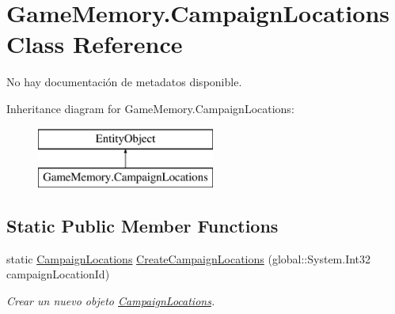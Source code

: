 \hypertarget{class_game_memory_1_1_campaign_locations}{\section{Game\-Memory.\-Campaign\-Locations Class Reference}
\label{class_game_memory_1_1_campaign_locations}
}


No hay documentación de metadatos disponible.  


Inheritance diagram for Game\-Memory.\-Campaign\-Locations\-:\begin{figure}[H]
\begin{center}
\leavevmode
\includegraphics[height=2.000000cm]{class_game_memory_1_1_campaign_locations}
\end{center}
\end{figure}
\subsection*{Static Public Member Functions}
\begin{DoxyCompactItemize}
\item 
static \hyperlink{class_game_memory_1_1_campaign_locations}{Campaign\-Locations} \hyperlink{class_game_memory_1_1_campaign_locations_af7165452c80ac0217123e7aa3c30cd31}{Create\-Campaign\-Locations} (global\-::\-System.\-Int32 campaign\-Location\-Id)
\begin{DoxyCompactList}\small\item\em Crear un nuevo objeto \hyperlink{class_game_memory_1_1_campaign_locations}{Campaign\-Locations}. \end{DoxyCompactList}\end{DoxyCompactItemize}

